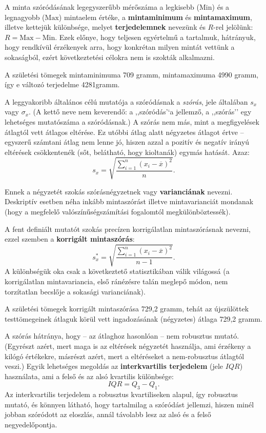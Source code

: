 \documentclass[]{book}
\begin{document}
A minta szóródásának legegyszerűbb mérőszáma a legkisebb
(\(\mathrm{Min}\)) és a legnagyobb (\(\mathrm{Max}\)) mintaelem értéke,
a \textbf{mintaminimum} és \textbf{mintamaximum}, illetve kettejük
különbsége, melyet \textbf{terjedelemnek} nevezünk és \(R\)-rel
jelölünk: \(R=\mathrm{Max}-\mathrm{Min}\). Ezek előnye, hogy teljesen
egyértelmű a tartalmuk, hátrányuk, hogy rendkívül érzékenyek arra, hogy
konkrétan milyen mintát vettünk a sokaságból, ezért következtetési
célokra nem is szokták alkalmazni.

A születési tömegek mintaminimuma 709 gramm, mintamaximuma 4990 gramm,
így e változó terjedelme 4281gramm.

A leggyakoribb általános célú mutatója a szóródásnak a \emph{szórás},
jele általában \(s_x\) vagy \(\sigma_x\). (A kettő neve nem keverendő: a
,,szóródás'`a jellemző, a ,,szórás'' egy lehetséges mutatószáma a
szóródásnak.) A szórás nem más, mint a megfigyelések átlagtól vett
átlagos eltérése. Ez utóbbi átlag alatt négyzetes átlagot értve --
egyszerű számtani átlag nem lenne jó, hiszen azzal a pozitív és negatív
irányú eltérések csökkentenék (sőt, belátható, hogy kioltanák) egymás
hatását. Azaz: \[
    s_x=\sqrt{\frac{\sum_{i=1}^n \left(x_i-\overline{x}\right)^2}{n}}.
\]

Ennek a négyzetét szokás szórásnégyzetnek vagy \textbf{varianciának}
nevezni. Deskriptív esetben néha inkább mintaszórást illetve
mintavarianciát mondanak (hogy a megfelelő valószínűségszámítási
fogalomtól megkülönböztessék).

A fent definiált mutatót szokás precízen korrigálatlan mintaszórásnak
nevezni, ezzel szemben a \textbf{korrigált mintaszórás}: \[
    s_x^{\ast}=\sqrt{\frac{\sum_{i=1}^n \left(x_i-\overline{x}\right)^2}{n-1}}.
\] A különbségük oka csak a következtető statisztikában válik világossá
(a korrigálatlan mintavariancia, első ránézésre talán meglepő módon, nem
torzítatlan becslője a sokasági varianciának).

A születési tömegek korrigált mintaszórása 729,2 gramm, tehát az
újszülöttek testtömegeinek átlaguk körül vett ingadozásának (négyzetes)
átlaga 729,2 gramm.

A szórás hátránya, hogy -- az átlaghoz hasonlóan -- nem robusztus
mutató. (Egyrészt azért, mert maga is az eltérések négyzetét használja,
ami érzékeny a kilógó értékekre, másrészt azért, mert a eltéréseket a
nem-robusztus átlagtól veszi.) Egyik lehetséges megoldás az
\textbf{interkvartilis terjedelem} (jele \(IQR\)) használata, ami a
felső és az alsó kvartilis különbsége: \[
    IQR=Q_3-Q_1.
\] Az interkvartilis terjedelem a robusztus kvartiliseken alapul, így
robusztus mutató, és könnyen látható, hogy tartalmilag a szóródást
jellemzi, hiszen minél jobban szóródott az eloszlás, annál távolabb lesz
az alsó és a felső negyedelőpontja.
\end{document}
